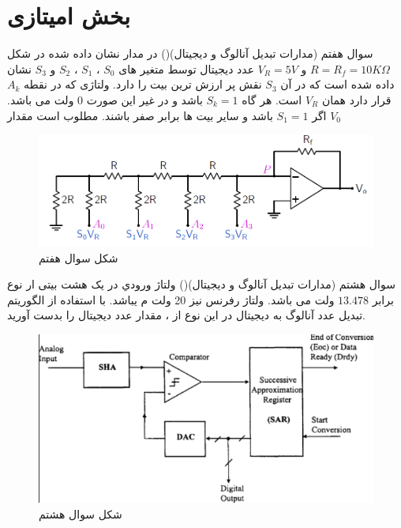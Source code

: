 \documentclass[12pt]{article}
\begin{document}
\section{بخش امیتازی}
    \begin{problem}{سوال هفتم}
	(مدارات تبدیل آنالوگ و دیجیتال)()
	در مدار نشان داده شده در شکل 
	$R = R_f = 10K\Omega$
	و
	$V_R = 5V$
	عدد دیجیتال توسط متغیر های $S_0$ ، $S_1$ ، $S_2$ و $S_3$ نشان داده شده است که در آن 
	$S_3$
	نقش پر ارزش ترین بیت را دارد. ولتاژی که در نقطه 
	$A_k$
	قرار دارد همان 
	$V_R$
	است. هر گاه 
	$S_k = 1$
	باشد و در غیر این صورت $0$ ولت می باشد. اگر 
	$S_1 = 1$
	باشد و سایر بیت ها برابر صفر باشند. مطلوب است مقدار $V_0$
	
	\end{problem}   
	\begin{figure}
		\includegraphics[width=\linewidth]{Resources/1.png}
		\caption{شکل سوال هفتم}
	\end{figure}
    \begin{problem}{سوال هشتم}
	(مدارات تبدیل آنالوگ و دیجیتال)() ولتاژ ورودي در یک  هشت بیتی ار نوع  برابر $13.478$ ولت می باشد. ولتاژ رفرنس 
	نیز 20 ولت م یباشد. با استفاده از الگوریتم تبدیل عدد آنالوگ به دیجیتال در این نوع از  ،
	مقدار عدد دیجیتال را بدست آورید.
	
	
	
	\end{problem}
	\begin{figure}
		\centering
		\includegraphics[scale=0.7]{Resources/2.png}
		\caption{شکل سوال هشتم}
	\end{figure}
\end{document}
